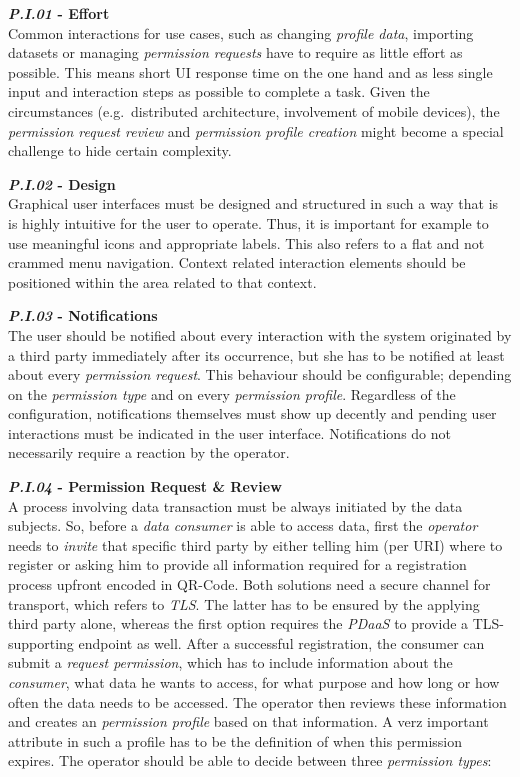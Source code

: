 \documentclass[12pt,english,a4paper,titlepage,cleardoublepage=empty,dottedtoc]{report}
\begin{document}
\textbf{\emph{\protect\hypertarget{pi01}{}{P.I.01}} - Effort}\\
Common interactions for use cases, such as changing \emph{profile data},
importing datasets or managing \emph{permission requests} have to
require as little effort as possible. This means short UI response time
on the one hand and as less single input and interaction steps as
possible to complete a task. Given the circumstances (e.g.~distributed
architecture, involvement of mobile devices), the \emph{permission
request review} and \emph{permission profile creation} might become a
special challenge to hide certain complexity.

\textbf{\emph{\protect\hypertarget{pi02}{}{P.I.02}} - Design}\\
Graphical user interfaces must be designed and structured in such a way
that is is highly intuitive for the user to operate. Thus, it is
important for example to use meaningful icons and appropriate labels.
This also refers to a flat and not crammed menu navigation. Context
related interaction elements should be positioned within the area
related to that context.

\textbf{\emph{\protect\hypertarget{pi03}{}{P.I.03}} - Notifications}\\
The user should be notified about every interaction with the system
originated by a third party immediately after its occurrence, but she
has to be notified at least about every \emph{permission request}. This
behaviour should be configurable; depending on the \emph{permission
type} and on every \emph{permission profile}. Regardless of the
configuration, notifications themselves must show up decently and
pending user interactions must be indicated in the user interface.
Notifications do not necessarily require a reaction by the operator.

\textbf{\emph{\protect\hypertarget{pi04}{}{P.I.04}} - Permission Request
\& Review}\\
A process involving data transaction must be always initiated by the
data subjects. So, before a \emph{data consumer} is able to access data,
first the \emph{operator} needs to \emph{invite} that specific third
party by either telling him (per URI) where to register or asking him to
provide all information required for a registration process upfront
encoded in QR-Code. Both solutions need a secure channel for transport,
which refers to \emph{TLS}. The latter has to be ensured by the applying
third party alone, whereas the first option requires the \emph{PDaaS} to
provide a TLS-supporting endpoint as well. After a successful
registration, the consumer can submit a \emph{request permission}, which
has to include information about the \emph{consumer}, what data he wants
to access, for what purpose and how long or how often the data needs to
be accessed. The operator then reviews these information and creates an
\emph{permission profile} based on that information. A verz important
attribute in such a profile has to be the definition of when this
permission expires. The operator should be able to decide between three
\emph{permission types}:
\end{document}
